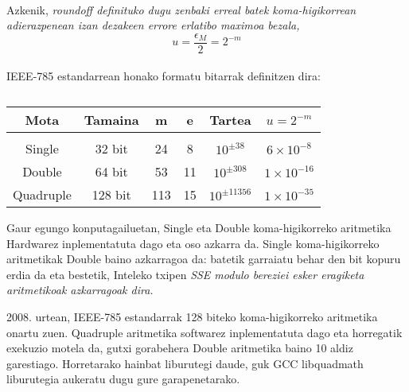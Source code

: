 \paragraph*{}
Azkenik, \it{roundoff} definituko dugu zenbaki erreal batek koma-higikorrean adierazpenean izan dezakeen errore erlatibo maximoa bezala,
\begin{equation*}
u=\frac{\epsilon_M}{2}=2^{-m}
\end{equation*}  


\paragraph*{}IEEE-785 estandarrean honako formatu bitarrak definitzen dira:

\begin{table} [h!]
\caption{}
\label{tab:1}       %
\begin{tabular}{ |c|c|c|c|c|c|} 
\hline
 Mota      &  Tamaina    & m   & e  & Tartea           &  $u=2^{-m}$           \\ \hline
           &             &     &    &                  &                       \\
 Single    & 32 bit      & 24  & 8  & $10^{\pm 38}$    &  $6 \times 10^{-8}$   \\	    
 Double    & 64 bit      & 53  & 11 & $10^{\pm 308}$   &  $1 \times 10^{-16}$   \\
 Quadruple & 128 bit     & 113 & 15 & $10^{\pm 11356}$ &  $1 \times 10^{-35}$   \\
\hline
\end{tabular}
\end{table}

Gaur egungo konputagailuetan, Single eta Double koma-higikorreko aritmetika Hardwarez inplementatuta dago eta oso azkarra da. Single koma-higikorreko aritmetikak Double baino azkarragoa da: batetik garraiatu behar den bit kopuru erdia da eta bestetik, Inteleko txipen \it SSE modulo bereziei esker eragiketa aritmetikoak azkarragoak dira.

2008. urtean, IEEE-785 estandarrak 128 biteko koma-higikorreko aritmetika onartu zuen. Quadruple aritmetika softwarez inplementatuta dago eta horregatik exekuzio motela da, gutxi gorabehera Double aritmetika baino 10 aldiz garestiago. Horretarako hainbat liburutegi daude, guk GCC libquadmath liburutegia aukeratu dugu gure garapenetarako.

